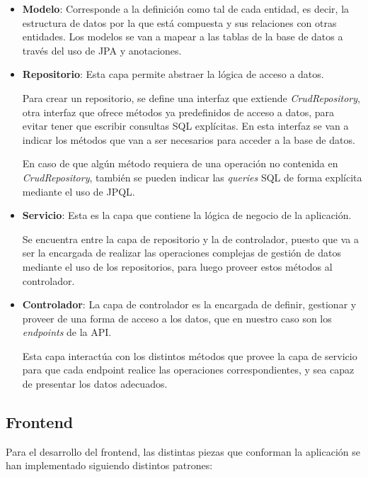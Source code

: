 \begin{itemize}
\item \textbf{Modelo}: Corresponde a la definición como tal de cada entidad, es decir, la estructura de datos por la que está compuesta y sus relaciones con otras entidades. Los modelos se van a mapear a las tablas de la base de datos a través del uso de JPA y anotaciones.

\item \textbf{Repositorio}: Esta capa permite abstraer la lógica de acceso a datos. 

Para crear un repositorio, se define una interfaz que extiende \textit{CrudRepository}, otra interfaz que ofrece métodos ya predefinidos de acceso a datos, para evitar tener que escribir consultas SQL explícitas. En esta interfaz se van a indicar los métodos que van a ser necesarios para acceder a la base de datos.

 En caso de que algún método requiera de una operación no contenida en \textit{CrudRepository}, también se pueden indicar las \textit{queries} SQL de forma explícita mediante el uso de JPQL.
 
\item \textbf{Servicio}: Esta es la capa que contiene la lógica de negocio de la aplicación. 

Se encuentra entre la capa de repositorio y la de controlador, puesto que va a ser la encargada de realizar las operaciones complejas de gestión de datos mediante el uso de los repositorios, para luego proveer estos métodos al controlador. 

\item \textbf{Controlador}: La capa de controlador es la encargada de definir, gestionar y proveer de una forma de acceso a los datos, que en nuestro caso son los \textit{endpoints} de la API. 

Esta capa interactúa con los distintos métodos que provee la capa de servicio para que cada endpoint realice las operaciones correspondientes, y sea capaz de presentar los datos adecuados.
\end{itemize}


\subsection{Frontend}

Para el desarrollo del frontend, las distintas piezas que conforman la aplicación se han implementado siguiendo distintos patrones:

